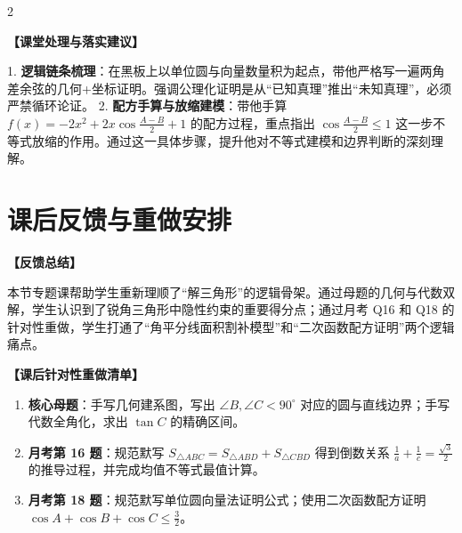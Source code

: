 \documentclass[11pt,a4paper]{ctexart}
\newcommand{\teachblock}[2]{%
  \par\addvspace{0.45em}%
  \noindent\textbf{【#1】}\par
  \begingroup
    \setlength{\parskip}{0.35em}%
    #2\par
  \endgroup
}
\begin{document}
\begin{paracol}{2}
\teachblock{课堂处理与落实建议}{
  1. \textbf{逻辑链条梳理}：在黑板上以单位圆与向量数量积为起点，带他严格写一遍两角差余弦的几何+坐标证明。强调公理化证明是从“已知真理”推出“未知真理”，必须严禁循环论证。
  2. \textbf{配方手算与放缩建模}：带他手算 $f(x) = -2x^2 + 2x\cos\frac{A-B}{2} + 1$ 的配方过程，重点指出 $\cos\frac{A-B}{2} \le 1$ 这一步不等式放缩的作用。通过这一具体步骤，提升他对不等式建模和边界判断的深刻理解。
}
\end{paracol}

\section{课后反馈与重做安排}

\teachblock{反馈总结}{
  本节专题课帮助学生重新理顺了“解三角形”的逻辑骨架。通过母题的几何与代数双解，学生认识到了锐角三角形中隐性约束的重要得分点；通过月考 Q16 和 Q18 的针对性重做，学生打通了“角平分线面积割补模型”和“二次函数配方证明”两个逻辑痛点。
}

\teachblock{课后针对性重做清单}{
  \begin{enumerate}
    \item \textbf{核心母题}：手写几何建系图，写出 $\angle B, \angle C < 90^\circ$ 对应的圆与直线边界；手写代数全角化，求出 $\tan C$ 的精确区间。
    \item \textbf{月考第 16 题}：规范默写 \(S_{\triangle ABC} = S_{\triangle ABD} + S_{\triangle CBD}\) 得到倒数关系 \(\frac{1}{a} + \frac{1}{c} = \frac{\sqrt{3}}{2}\) 的推导过程，并完成均值不等式最值计算。
    \item \textbf{月考第 18 题}：规范默写单位圆向量法证明公式；使用二次函数配方证明 \(\cos A + \cos B + \cos C \le \frac{3}{2}\)。
  \end{enumerate}
}
\end{document}
